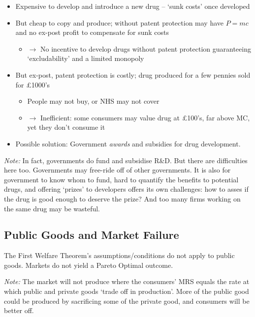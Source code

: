 \documentclass[]{article}
\providecommand{\tightlist}{%
  \setlength{\itemsep}{0pt}\setlength{\parskip}{0pt}}
\begin{document}
\begin{itemize}
\tightlist
\item
  Expensive to develop and introduce a new drug -- `sunk costs' once developed
\item
  But cheap to copy and produce; without patent protection may have \(P=mc\) and no ex-post profit to compensate for sunk costs

  \begin{itemize}
  \tightlist
  \item
    \(\rightarrow\) No incentive to develop drugs without patent protection guaranteeing `excludability' and a limited monopoly
  \end{itemize}
\item
  But ex-post, patent protection is costly; drug produced for a few pennies sold for £1000's

  \begin{itemize}
  \tightlist
  \item
    People may not buy, or NHS may not cover
  \item
    \(\rightarrow\) Inefficient: some consumers may value drug at £100's, far above MC, yet they don't consume it
  \end{itemize}
\item
  Possible solution: Government \emph{awards} and subsidies for drug development.
\end{itemize}

\emph{Note:} In fact, governments do fund and subsidise R\&D. But there are difficulties here too. Governments may free-ride off of other governments. It is also for government to know whom to fund, hard to quantify the benefits to potential drugs, and offering `prizes' to developers offers its own challenges: how to asses if the drug is good enough to deserve the prize? And too many firms working on the same drug may be wasteful.

\medskip

\hypertarget{public-goods-and-market-failure}{%
\subsection{Public Goods and Market Failure}\label{public-goods-and-market-failure}}

The First Welfare Theorem's assumptions/conditions do not apply to public goods. Markets do not yield a Pareto Optimal outcome.

\emph{Note:} The market will not produce where the consumers' MRS equals the rate at which public and private goods `trade off in production'. More of the public good could be produced by sacrificing some of the private good, and consumers will be better off.\\
\end{document}
